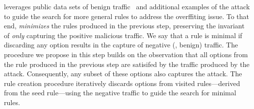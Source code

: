 \documentclass[sigconf,review, anonymous]{acmart}
\begin{document}
\tname{} leverages public data sets of benign traffic~\cite{tcpreplay}
and additional examples of the attack to guide the search for more
general rules to address the overffiting issue. To that end, \tname{}
\emph{minimizes} the rules produced in the previous step, preserving
the invariant of \emph{only} capturing the positive malicious
traffic. We say that a rule is minimal if discarding any option
results in the capture of negative (\ie{}, benign) traffic.  The
procedure we propose in this step builds on the observation that all
options from the rule produced in the previous step are satisifed by
the traffic produced by the attack. Consequently, any subset of these
options also captures the attack. The rule creation procedure
iteratively discards options from visited rules---derived from the
seed rule---using the negative traffic to guide the search for minimal
rules.
\end{document}
